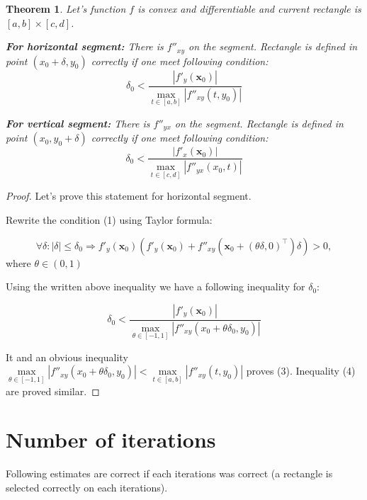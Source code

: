 \documentclass[12pt]{article}
\newtheorem{theorem}{Theorem}[section]
\begin{document}
\begin{theorem}
Let's function $f$ is convex and differentiable and current rectangle is $[a,b]\times[c,d]$.

\textbf{For horizontal segment:}  There is $f''_{xy}$ on the segment. Rectangle is defined in point $(x_0 + \delta, y_0)$ correctly if one meet following condition:
\begin{equation}
\delta_0 < \frac{|f'_y(\textbf{x}_0)|}{\max\limits_{t\in [a,b]}|f''_{xy}(t, y_0)|}
\end{equation}

\textbf{For vertical segment:}  There is $f''_{yx}$ on the segment. Rectangle is defined in point $(x_0, y_0+\delta)$ correctly if one meet following condition:
\begin{equation}
\delta_0 < \frac{|f'_x(\textbf{x}_0)|}{\max\limits_{t\in [c,d]}|f''_{yx}(x_0, t)|}
\end{equation}

\end{theorem}
\begin{proof}

Let's prove this statement for horizontal segment.

Rewrite the condition (1) using Taylor formula:

$$\forall \delta:|\delta|\leq\delta_0\Rightarrow f'_y(\textbf{x}_0)\left(f'_y(\textbf{x}_0)+f''_{xy}\left(\textbf{x}_0+(\theta\delta,0)^\top\right)\delta\right) > 0,$$
where $\theta\in(0,1)$

Using the written above inequality we have a following inequality for $\delta_0$:

$$\delta_0<\frac{|f'_y(\textbf{x}_0)|}{\max\limits_{\theta \in [-1, 1]}|f''_{xy}(x_0 + \theta\delta_0, y_0)|}$$

It and an obvious inequality $\max\limits_{\theta \in [-1, 1]}|f''_{xy}(x_0 + \theta\delta_0, y_0)| < \max\limits_{t\in [a,b]}|f''_{xy}(t, y_0)|$ proves (3). Inequality (4) are proved similar.
\end{proof}


\section{Number of iterations}

Following estimates are correct if each iterations was correct (a rectangle is selected correctly on each iterations).
\end{document}

